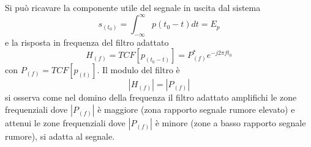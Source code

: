         \begin{figure}[H]
            \centering
            \hfill
        \end{figure}
        Si può ricavare la componente utile del segnale in uscita dal sistema
        \[
            s_{(t_0)} = \int_{-\infty}^{\infty} p{(t_0-t)}dt = E_p  
        \]
        e la risposta in frequenza del filtro adattato
        \[
            H_{(f)} = TCF[p_{(t_0-t)}] = P^*_{(f)}e^{-j2\pi ft_0}    
        \]
        con $P_(f) = TCF[p_{(t)}]$. Il modulo del filtro è 
        \[
            \left|H_{(f)}\right| = \left|P_{(f)}\right|   
        \] 
        si osserva come nel domino della frequenza il filtro adattato amplifichi le zone frequenziali dove $ \left|P_{(f)}\right|$
        è maggiore (zona rapporto segnale rumore elevato) e attenui le zone frequenziali dove $ \left|P_{(f)}\right|$ è minore 
        (zone a basso rapporto segnale rumore), si adatta al segnale.

